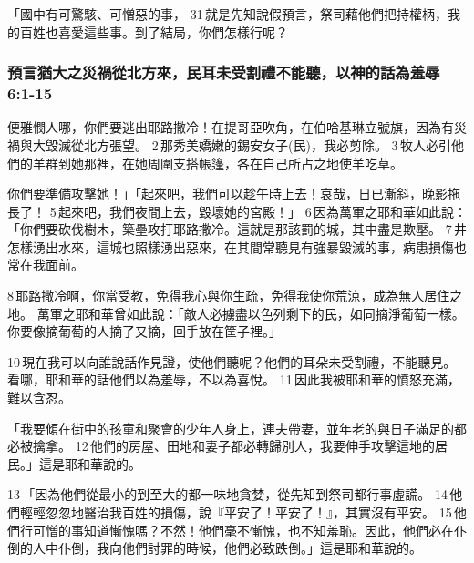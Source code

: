 「國中有可驚駭、可憎惡的事， 31 就是先知說假預言，祭司藉他們把持權柄，我的百姓也喜愛這些事。到了結局，你們怎樣行呢？

\subsubsection{預言猶大之災禍從北方來，民耳未受割禮不能聽，以神的話為羞辱 6:1-15}
便雅憫人哪，你們要逃出耶路撒冷！在提哥亞吹角，在伯哈基琳立號旗，因為有災禍與大毀滅從北方張望。 2 那秀美嬌嫩的錫安女子(民)，我必剪除。 3 牧人必引他們的羊群到她那裡，在她周圍支搭帳篷，各在自己所占之地使羊吃草。

你們要準備攻擊她！」「起來吧，我們可以趁午時上去！哀哉，日已漸斜，晚影拖長了！ 5 起來吧，我們夜間上去，毀壞她的宮殿！」 6 因為萬軍之耶和華如此說：「你們要砍伐樹木，築壘攻打耶路撒冷。這就是那該罰的城，其中盡是欺壓。 7 井怎樣湧出水來，這城也照樣湧出惡來，在其間常聽見有強暴毀滅的事，病患損傷也常在我面前。

 8 耶路撒冷啊，你當受教，免得我心與你生疏，免得我使你荒涼，成為無人居住之地。
萬軍之耶和華曾如此說：「敵人必擄盡以色列剩下的民，如同摘淨葡萄一樣。你要像摘葡萄的人摘了又摘，回手放在筐子裡。」

 10 現在我可以向誰說話作見證，使他們聽呢？他們的耳朵未受割禮，不能聽見。看哪，耶和華的話他們以為羞辱，不以為喜悅。 11 因此我被耶和華的憤怒充滿，難以含忍。

「我要傾在街中的孩童和聚會的少年人身上，連夫帶妻，並年老的與日子滿足的都必被擒拿。 12 他們的房屋、田地和妻子都必轉歸別人，我要伸手攻擊這地的居民。」這是耶和華說的。 



13 「因為他們從最小的到至大的都一味地貪婪，從先知到祭司都行事虛謊。 14 他們輕輕忽忽地醫治我百姓的損傷，說『平安了！平安了！』，其實沒有平安。 15 他們行可憎的事知道慚愧嗎？不然！他們毫不慚愧，也不知羞恥。因此，他們必在仆倒的人中仆倒，我向他們討罪的時候，他們必致跌倒。」這是耶和華說的。


